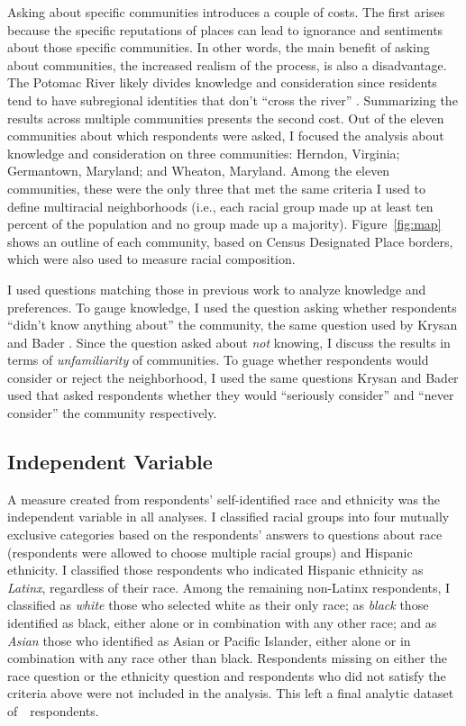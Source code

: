 \documentclass{baderart}
\begin{document}
Asking about specific communities introduces a couple of costs. The first arises because the specific reputations of places can lead to ignorance and sentiments about those specific communities. In other words, the main benefit of asking about communities, the increased realism of the process, is also a disadvantage. The Potomac River likely divides knowledge and consideration since residents tend to have subregional identities that don't ``cross the river'' \citep{lacy_blue-chip_2007}. Summarizing the results across multiple communities presents the second cost. Out of the eleven communities about which respondents were asked, I focused the analysis about knowledge and consideration on three communities: Herndon, Virginia; Germantown, Maryland; and Wheaton, Maryland. Among the eleven communities, these were the only three that met the same criteria I used to define multiracial neighborhoods (i.e., each racial group made up at least ten percent of the population and no group made up a majority). Figure~\ref{fig:map} shows an outline of each community, based on Census Designated Place borders, which were also used to measure racial composition.

I used questions matching those in previous work to analyze knowledge and preferences. To gauge knowledge, I used the question asking whether respondents ``didn't know anything about'' the community, the same question used by Krysan and Bader \citeyearpar{krysan_racial_2009}. Since the question asked about \emph{not} knowing, I discuss the results in terms of \emph{unfamiliarity} of communities. To guage whether respondents would consider or reject the neighborhood, I used the same questions Krysan and Bader \citeyearpar[][\citealt{bader_community_2015}]{krysan_perceiving_2007, krysan_racial_2009} used that asked respondents whether they would ``seriously consider'' and ``never consider'' the community respectively. 

\subsection{Independent Variable}\label{independent-variable}

A measure created from respondents' self-identified race and ethnicity was the independent variable in all analyses. I classified racial groups into four mutually exclusive categories based on the respondents' answers to questions about race (respondents were allowed to choose multiple racial groups) and Hispanic ethnicity. 
I classified those respondents who indicated Hispanic ethnicity as \emph{Latinx}, regardless of their race. Among the remaining non-Latinx respondents, I classified as \emph{white} those who selected white as their only race; as \emph{black} those identified as black, either alone or in combination with any other race; and as \emph{Asian} those who identified as Asian or Pacific Islander, either alone or in combination with any race other than black. Respondents missing on either the race question or the ethnicity question and respondents who did not satisfy the criteria above were not included in the analysis. This left a final analytic dataset of~\N\ respondents.
\end{document}

